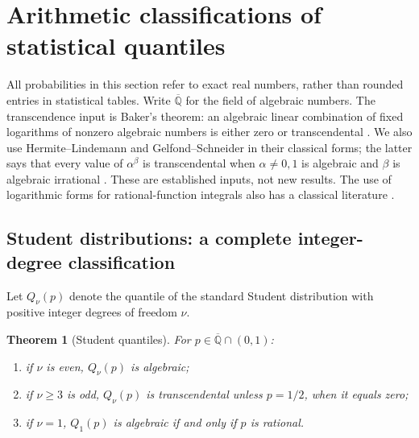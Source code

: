 \documentclass[11pt,a4paper]{article}
\newtheorem{theorem}{Theorem}[section]
\theoremstyle{definition}
\theoremstyle{remark}
\numberwithin{equation}{section}
\begin{document}
\section{Arithmetic classifications of statistical quantiles}
\label{beta-stats-sec-quantiles}

All probabilities in this section refer to exact real numbers, rather than
rounded entries in statistical tables. Write $\overline{\mathbb Q}$ for the
field of algebraic numbers. The transcendence input is Baker's theorem:
an algebraic linear combination of fixed logarithms of nonzero algebraic
numbers is either zero or transcendental \cite{beta-stats-baker67}.
We also use Hermite--Lindemann and Gelfond--Schneider in their classical
forms; the latter says that every value of $\alpha^\beta$ is
transcendental when $\alpha\ne0,1$ is algebraic and $\beta$ is algebraic
irrational \cite{beta-stats-baker66}. These are established inputs, not
new results. The use of logarithmic forms for rational-function integrals
also has a classical literature \cite{beta-stats-vdp}.

\subsection{Student distributions: a complete integer-degree classification}

Let $Q_\nu(p)$ denote the quantile of the standard Student distribution
with positive integer degrees of freedom $\nu$.

\begin{theorem}[Student quantiles]
\label{beta-stats-thm-student}
For $p\in\overline{\mathbb Q}\cap(0,1)$:
\begin{enumerate}
\item if $\nu$ is even, $Q_\nu(p)$ is algebraic;
\item if $\nu\ge3$ is odd, $Q_\nu(p)$ is transcendental unless
      $p=1/2$, when it equals zero;
\item if $\nu=1$, $Q_1(p)$ is algebraic if and only if $p$ is rational.
\end{enumerate}
\end{theorem}
\end{document}
